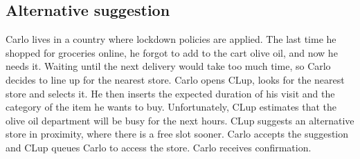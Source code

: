 \documentclass[../../main.tex]{subfiles}
\begin{document}
    \subsection*{Alternative suggestion}

    Carlo lives in a country where lockdown policies are applied. The last time he shopped for groceries online, 
    he forgot to add to the cart olive oil, and now he needs it. Waiting until the next delivery would take too much time, 
    so Carlo decides to line up for the nearest store. 
    Carlo opens CLup, looks for the nearest store and selects it. 
    He then inserts the expected duration of his visit and the category of the item he wants to buy. 
    Unfortunately, CLup estimates that the olive oil department will be busy for the next hours. 
    CLup suggests an alternative store in proximity, where there is a free slot sooner. 
    Carlo accepts the suggestion and CLup queues Carlo to access the store. Carlo receives confirmation.
\end{document}
